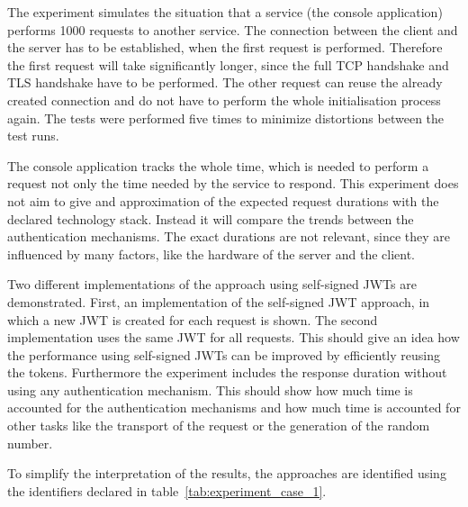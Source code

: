 The experiment simulates the situation that a service (the console application) performs 1000 requests to another service.
The connection between the client and the server has to be established, when the first request is performed.
Therefore the first request will take significantly longer, since the full TCP handshake and TLS handshake have to be performed.
The other request can reuse the already created connection and do not have to perform the whole initialisation process again.
The tests were performed five times to minimize distortions between the test runs.

The console application tracks the whole time, which is needed to perform a request not only the time needed by the service to respond.
This experiment does not aim to give and approximation of the expected request durations with the declared technology stack.
Instead it will compare the trends between the authentication mechanisms.
The exact durations are not relevant, since they are influenced by many factors, like the hardware of the server and the client.

Two different implementations of the approach using self-signed JWTs are demonstrated.
First, an implementation of the self-signed JWT approach, in which a new JWT is created for each request is shown.
The second implementation uses the same JWT for all requests.
This should give an idea how the performance using self-signed JWTs can be improved by efficiently reusing the tokens.
Furthermore the experiment includes the response duration without using any authentication mechanism.
This should show how much time is accounted for the authentication mechanisms and how much time is accounted for other tasks like the transport of the request or the generation of the random number.

To simplify the interpretation of the results, the approaches are identified using the identifiers declared in table~\ref{tab:experiment_case_1}.

